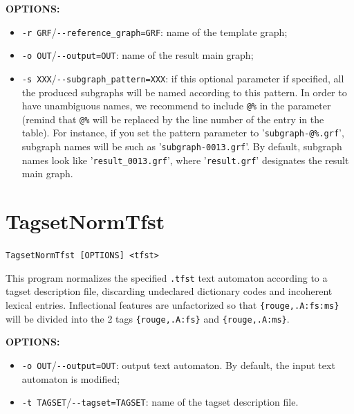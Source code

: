 \bigskip
\noindent \textbf{OPTIONS:}
\begin{itemize}
  \item \verb+-r GRF+/\verb+--reference_graph=GRF+: name of the template graph;
  
  \item \verb+-o OUT+/\verb+--output=OUT+: name of the result main graph;
  
  \item \verb+-s XXX+/\verb+--subgraph_pattern=XXX+: if this optional parameter
  if specified, all the produced subgraphs will be named according to this pattern. 
  In order to have unambiguous names, we recommend to include \verb+@%+ in the parameter 
  (remind that \verb+@%+ will be replaced by the line number of the entry in the table). 
  For instance, if you set the pattern parameter to '\verb+subgraph-@%.grf+', 
  subgraph names will be such as '\verb+subgraph-0013.grf+'. By default,
  subgraph names look like '\verb+result_0013.grf+', where '\verb+result.grf+' 
  designates the result main graph.
\end{itemize}







\section{TagsetNormTfst} \verb+TagsetNormTfst [OPTIONS] <tfst>+

\bigskip
\noindent This program normalizes the specified \verb+.tfst+ text automaton according
to a tagset description file, discarding undeclared dictionary codes
and incoherent lexical entries. Inflectional features are unfactorized so 
that \verb+{rouge,.A:fs:ms}+ will be divided into the 2 tags \verb+{rouge,.A:fs}+ 
and \verb+{rouge,.A:ms}+.

\bigskip
\noindent \textbf{OPTIONS:}
\begin{itemize}
  \item \verb+-o OUT+/\verb+--output=OUT+: output text automaton. By default,
  the input text automaton is modified;
  \item \verb+-t TAGSET+/\verb+--tagset=TAGSET+: name of the tagset description
  file.
\end{itemize}







